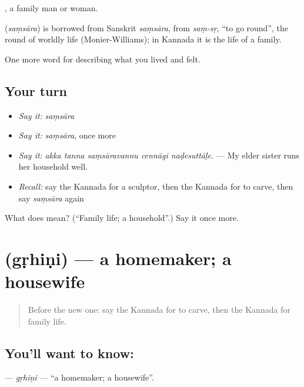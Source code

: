 , a family man or woman.

\begin{cousinweb}
\textbf{} (\emph{saṃsāra}) is borrowed from Sanskrit \emph{saṃsāra}, from \emph{saṃ-sṛ}, \textquotedblleft{}to go round\textquotedblright{}, the round of worldly life (Monier-Williams); in Kannada it is the life of a family.
\end{cousinweb}

\begin{grammarlens}[title={What you've built}]
One more word for describing what you lived and felt.
\end{grammarlens}

\subsection*{Your turn}
\begin{itemize}
\raggedright
  \item \emph{Say it:} \emph{saṃsāra}
  \item \emph{Say it:} \emph{saṃsāra}, once more
  \item \emph{Say it:} \emph{akka tanna saṃsāravannu cennāgi naḍesuttāḷe.} — My elder sister runs her household well.
  \item \emph{Recall:} say the Kannada for a sculptor, then the Kannada for to carve, then say \emph{saṃsāra} again
\end{itemize}

\begin{tcolorbox}[breakable,colback=teal!4,colframe=teal!35!black,title={Before you move on}]
What does  mean? (\textquotedblleft{}Family life; a household\textquotedblright{}.) Say it once more.
\end{tcolorbox}
\section[\texorpdfstring{\kn{ಗೃಹಿಣಿ} (gṛhiṇi)}{ಗೃಹಿಣಿ (gṛhiṇi)}]{ (gṛhiṇi) — a homemaker; a housewife}

\label{lesson:KA-C523-grhini}



\begin{quote}
Before the new one: say the Kannada for to carve, then the Kannada for family life.
\end{quote}

\subsection*{You'll want to know: }
\textbf{} — \emph{gṛhiṇi} — \textquotedblleft{}a homemaker; a housewife\textquotedblright{}.

